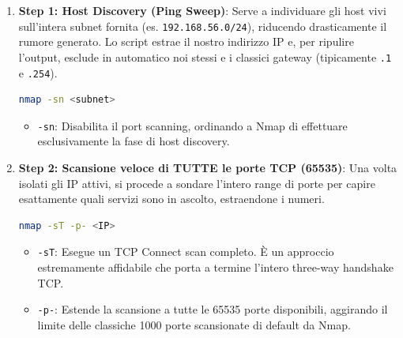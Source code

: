 \documentclass[12pt,a4paper]{report}
\begin{document}
	\begin{enumerate}
		\item \textbf{Step 1: Host Discovery (Ping Sweep)}: Serve a individuare gli host vivi sull'intera subnet fornita (es. \texttt{192.168.56.0/24}), riducendo drasticamente il rumore generato. Lo script estrae il nostro indirizzo IP e, per ripulire l'output, esclude in automatico noi stessi e i classici gateway (tipicamente \texttt{.1} e \texttt{.254}).
		\begin{lstlisting}[language=bash]
			nmap -sn <subnet>
		\end{lstlisting}
		\begin{itemize}
			\item \texttt{-sn}: Disabilita il port scanning, ordinando a Nmap di effettuare esclusivamente la fase di host discovery.
		\end{itemize}
		
		\item \textbf{Step 2: Scansione veloce di TUTTE le porte TCP (65535)}: Una volta isolati gli IP attivi, si procede a sondare l'intero range di porte per capire esattamente quali servizi sono in ascolto, estraendone i numeri.
		\begin{lstlisting}[language=bash]
			nmap -sT -p- <IP>
		\end{lstlisting}
		\begin{itemize}
			\item \texttt{-sT}: Esegue un TCP Connect scan completo. È un approccio estremamente affidabile che porta a termine l'intero three-way handshake TCP.
			\item \texttt{-p-}: Estende la scansione a tutte le 65535 porte disponibili, aggirando il limite delle classiche 1000 porte scansionate di default da Nmap.
		\end{itemize}
		

\end{enumerate}
\end{document}
